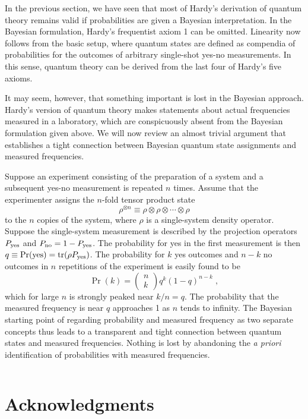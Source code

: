 \documentclass[pra,12pt,tightenlines]{revtex4-2}
\def\tr{{\rm tr}}
\def\yes{{\rm yes}}
\newcommand{\vc}[2]{\left(\begin{array}{c}{\!\!#1\!\!}\\{\!\!#2\!\!}\end{array}\right)}
\begin{document}
In the previous section, we have seen that most of Hardy's derivation of
quantum theory remains valid if probabilities are given a Bayesian
interpretation. In the Bayesian formulation, Hardy's frequentist axiom 1 can
be omitted. Linearity now follows from the basic setup, where quantum states
are defined as compendia of probabilities for the outcomes of arbitrary
single-shot yes-no measurements. In this sense, quantum theory can be derived
from the last four of Hardy's five axioms.

It may seem, however, that something important is lost in the Bayesian
approach. Hardy's version of quantum theory makes statements about actual
frequencies measured in a laboratory, which are conspicuously absent from the
Bayesian formulation given above. We will now review an almost trivial
argument that establishes a tight connection between Bayesian quantum state
assignments and measured frequencies.

Suppose an experiment consisting of the preparation of a system and a
subsequent yes-no measurement is repeated $n$ times. Assume that the
experimenter assigns the $n$-fold tensor product state
\begin{equation}
\rho^{\otimes n} \equiv \rho\otimes\rho\otimes \cdots \otimes \rho
\end{equation}
to the $n$ copies of the system, where $\rho$ is a single-system density
operator. Suppose the single-system measurement is described by the projection
operators $P_{\yes}$ and $P_{{\rm no}}=1-P_{\yes}$. The probability for yes in
the first measurement is then $q\equiv\Pr(\yes)=\tr(\rho P_{\yes})$. The
probability for $k$ yes outcomes and $n-k$ no outcomes in $n$ repetitions of
the experiment is easily found to be
\begin{equation}
\Pr(k) = {\vc n k} q^k (1-q)^{n-k} \;,
\end{equation}
which for large $n$ is strongly peaked near $k/n=q$. The probability that the
measured frequency is near $q$ approaches 1 as $n$ tends to infinity.  The
Bayesian starting point of regarding probability and measured frequency as two
separate concepts thus leads to a transparent and tight connection
between quantum states and measured frequencies. Nothing is lost by abandoning
the {\it a priori\/} identification of probabilities with measured
frequencies.

$\;$ \section*{Acknowledgments}
\end{document}
